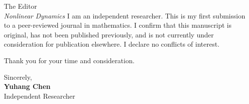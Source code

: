 \documentclass[a4paper,11pt]{letter}
\begin{document}
\begin{letter}{The Editor\\
\textit{Nonlinear Dynamics}}
I am an independent researcher. This is my first submission to a peer-reviewed journal in mathematics. I confirm that this manuscript is original, has not been published previously, and is not currently under consideration for publication elsewhere. I declare no conflicts of interest.

Thank you for your time and consideration.

\vspace{2em}
\noindent Sincerely,\\[3em]
\textbf{Yuhang Chen}\\
Independent Researcher

\end{letter}
\end{document}
